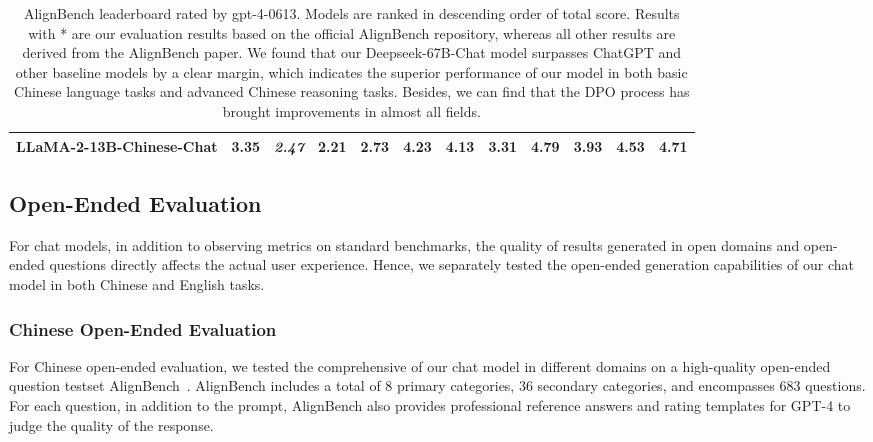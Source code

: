 \documentclass[11pt, a4paper, logo, copyright, nonumbering]{deepseek}
\begin{document}
\begin{CJK*}{UTF8}{gbsn}
\begin{table}[t]
{\begin{tabular}{@{}l|c|ccc|ccccccc@{}}
LLaMA-2-13B-Chinese-Chat       & \textbf{3.35}                     & \multicolumn{1}{c|}{\textit{2.47}}                                   & 2.21                                            & 2.73                                            & \multicolumn{1}{c|}{4.23}                                            & 4.13                                            & 3.31                                            & 4.79                                            & 3.93                                            & 4.53                                            & 4.71                                            \\ \bottomrule
\end{tabular}
}
\caption{AlignBench leaderboard rated by gpt-4-0613. Models are ranked in descending order of total score. Results with * are our evaluation results based on the official AlignBench repository, whereas all other results are derived from the AlignBench paper.
We found that our Deepseek-67B-Chat model surpasses ChatGPT and other baseline models by a clear margin,
which indicates the superior performance of our model in both basic Chinese language tasks and advanced Chinese reasoning tasks. 
Besides, we can find that the DPO process has brought improvements in almost all fields.
}
\label{tab:align_bench_results}
\end{table}

\subsection{Open-Ended Evaluation}
For chat models, in addition to observing metrics on standard benchmarks, the quality of results generated in open domains and open-ended questions directly affects the actual user experience. 
Hence, we separately tested the open-ended generation capabilities of our chat model in both Chinese and English tasks.

\subsubsection{Chinese Open-Ended Evaluation}
For Chinese open-ended evaluation, we tested the comprehensive of our chat model in different domains on a high-quality open-ended question testset AlignBench~\citep{align_bench}.
AlignBench includes a total of 8 primary categories,  36 secondary categories, and encompasses 683 questions. 
For each question, in addition to the prompt, AlignBench also provides professional reference answers and rating templates for GPT-4 to judge the quality of the response.


\end{CJK*}
\end{document}
